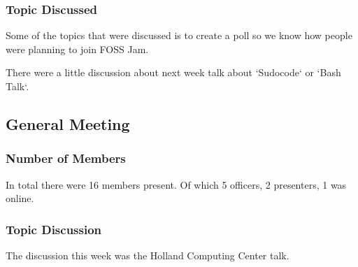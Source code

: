 \subsubsection{Topic Discussed}

Some of the topics that were discussed is to create a poll so we know how people were planning to join FOSS Jam.

There were a little discussion about next week talk about `Sudocode` or `Bash Talk`.

\subsection{General Meeting}
\subsubsection{Number of Members}
In total there were 16 members present. Of which 5 officers, 2 presenters, 1 was online. 

\subsubsection{Topic Discussion}
The discussion this week was the Holland Computing Center talk.